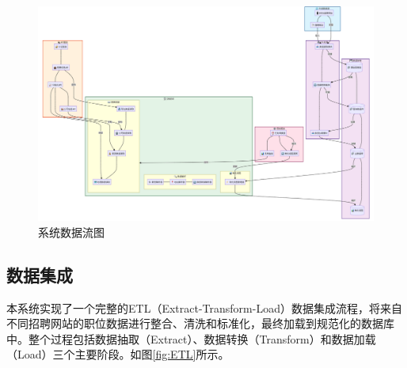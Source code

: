 \begin{figure}[htbp]
    \centering
    \includegraphics[width=1.0\textwidth]{figures/系统数据流图.png}
    \caption{系统数据流图}
    \label{fig:system_dataflow}
\end{figure}

\subsection{数据集成}
本系统实现了一个完整的ETL（Extract-Transform-Load）数据集成流程，将来自不同招聘网站的职位数据进行整合、清洗和标准化，最终加载到规范化的数据库中。整个过程包括数据抽取（Extract）、数据转换（Transform）和数据加载（Load）三个主要阶段。如图\ref{fig:ETL}所示。

